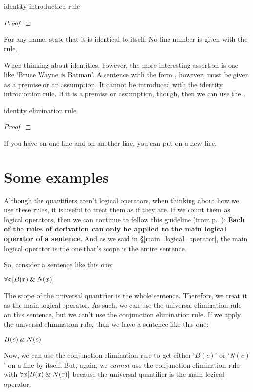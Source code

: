 \begin{factboxy}{identity introduction rule}
\begin{proof}
	 \ii{}
\end{proof}

\small{For any name, state that it is identical to itself. No line number is given with the rule.}
\end{factboxy}

When thinking about identities, however, the more interesting assertion is one like `Bruce Wayne \textit{is} Batman'. A sentence with the form , however, must be given as a premise or an assumption. It cannot be introduced with the identity introduction rule. If it is a premise or assumption, though, then we can use the .  

\begin{factboxy}{identity elimination rule}
\begin{proof}
	 
\end{proof}

\small{If you have  on one line and  on another line, you can put  on a new line.}
\end{factboxy}




\section{Some examples}

Although the quantifiers aren't logical operators, when thinking about how we use these rules, it is useful to treat them as if they are. If we count them as logical operators, then we can continue to follow this guideline (from p.~\pageref{rule-proofs-main-operator}): \textbf{Each of the rules of derivation can only be applied to the main logical operator of a sentence}. And as we said in \S \ref{main_logical_operator}, the main logical operator is the one that's scope is the entire sentence. 

So, consider a sentence like this one:

\begin{ebullet}
\item[] $\forall x[B(x) \mathbin{\&} N(x)]$
\end{ebullet}
The scope of the universal quantifier is the whole sentence. Therefore, we treat it as the main logical operator. As such, we can use the universal elimination rule on this sentence, but we can't use the conjunction elimination rule. If we apply the universal elimination rule, then we have a sentence like this one:
\begin{ebullet}
\item[] $B(c) \mathbin{\&} N(c)$
\end{ebullet}
Now, we can use the conjunction elimination rule to get either `$B(c)$' or `$N(c)$' on a line by itself. But, again, we \textit{cannot} use the conjunction elimination rule with $\forall x[B(x) \mathbin{\&} N(x)]$ because the universal quantifier is the main logical operator.

